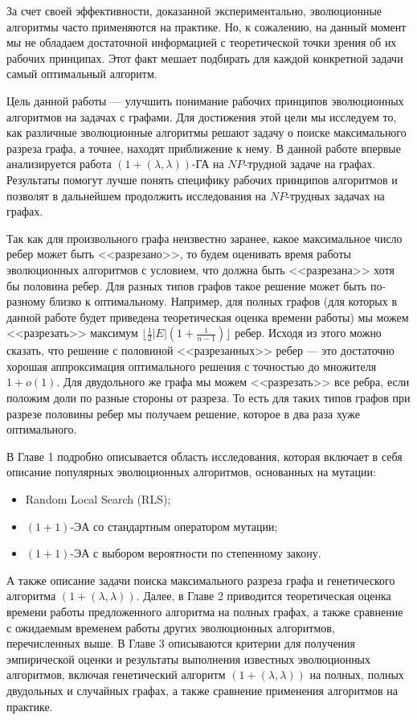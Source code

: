 \documentclass[times]{itmo-student-thesis}
\newcommand{\alglambda}{${(1 + (\lambda , \lambda))}$\xspace}
\newcommand{\alglambdaf}{${(1 + (\lambda , \lambda))}$-ГА\xspace}
\newcommand{\oea}{\mbox{$(1 + 1)$-ЭА}\xspace}
\begin{document}
За счет своей эффективности, доказанной экспериментально, эволюционные алгоритмы часто применяются на практике.
Но, к сожалению, на данный момент мы не обладаем достаточной информацией с теоретической точки зрения об их рабочих принципах.
Этот факт мешает подбирать для каждой конкретной задачи самый оптимальный алгоритм.

Цель данной работы --- улучшить понимание рабочих принципов эволюционных алгоритмов на задачах с графами.
Для достижения этой цели мы исследуем то, как различные эволюционные алгоритмы решают задачу о поиске максимального разреза графа, а точнее, находят приближение к нему.
В данной работе впервые анализируется работа \alglambdaf на $NP$-трудной задаче на графах.
Результаты помогут лучше понять специфику рабочих принципов алгоритмов и позволят в дальнейшем продолжить исследования на $NP$-трудных задачах на графах.

Так как для произвольного графа неизвестно заранее, какое максимальное число ребер может быть <<разрезано>>, то будем оценивать время работы эволюционных алгоритмов с условием, что должна быть <<разрезана>> хотя бы половина ребер.
Для разных типов графов такое решение может быть по-разному близко к оптимальному.
Например, для полных графов (для которых в данной работе будет приведена теоретическая оценка времени работы) мы можем <<разрезать>> максимум $\lfloor\frac{1}{2} |E| (1 + \frac{1}{n-1})\rfloor$ ребер.
Исходя из этого можно сказать, что решение с половиной <<разрезанных>> ребер --- это достаточно хорошая аппроксимация оптимального решения с точностью до множителя $1 + o(1)$.
Для двудольного же графа мы можем <<разрезать>> все ребра, если положим доли по разные стороны от разреза.
То есть для таких типов графов при разрезе половины ребер мы получаем решение, которое в два раза хуже оптимального.

В Главе 1 подробно описывается область исследования, которая включает в себя описание популярных эволюционных алгоритмов, основанных на мутации:
\begin{itemize}
  \item Random Local Search (RLS);
  \item \oea со стандартным оператором мутации;
  \item \oea с выбором вероятности по степенному закону.
\end{itemize}
А также описание задачи поиска максимального разреза графа и генетического алгоритма \alglambda.
Далее, в Главе 2 приводится теоретическая оценка времени работы предложенного алгоритма на полных графах, а также сравнение с ожидаемым временем работы других эволюционных алгоритмов, перечисленных выше.
В Главе 3 описываются критерии для получения эмпирической оценки и результаты выполнения известных эволюционных алгоритмов, включая генетический алгоритм \alglambda на полных, полных двудольных и случайных графах, а также сравнение применения алгоритмов на практике.
\end{document}
